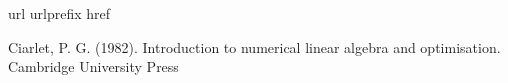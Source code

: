 \documentclass[a4paper,10pt]{scrartcl}
\numberwithin{equation}{section}
\begin{document}






\newpage
\begin{thebibliography}{10}
  \expandafter\ifx\csname url\endcsname\relax
  \def\url#1{\texttt{#1}}\fi
  \expandafter\ifx\csname urlprefix\endcsname\relax\def\urlprefix{URL }\fi
  \expandafter\ifx\csname href\endcsname\relax
  \def\href#1#2{#2} \def\path#1{#1}\fi

  Ciarlet, P. G. (1982).
  Introduction to numerical linear algebra and optimisation.
  Cambridge University Press

\end{thebibliography}
\end{document}
